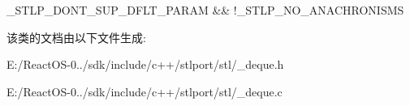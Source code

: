 \+\_\+\+S\+T\+L\+P\+\_\+\+D\+O\+N\+T\+\_\+\+S\+U\+P\+\_\+\+D\+F\+L\+T\+\_\+\+P\+A\+R\+AM \&\& !\+\_\+\+S\+T\+L\+P\+\_\+\+N\+O\+\_\+\+A\+N\+A\+C\+H\+R\+O\+N\+I\+S\+MS 

该类的文档由以下文件生成\+:\begin{DoxyCompactItemize}
\item 
E\+:/\+React\+O\+S-\/0../sdk/include/c++/stlport/stl/\+\_\+deque.\+h\item 
E\+:/\+React\+O\+S-\/0../sdk/include/c++/stlport/stl/\+\_\+deque.\+c\end{DoxyCompactItemize}
